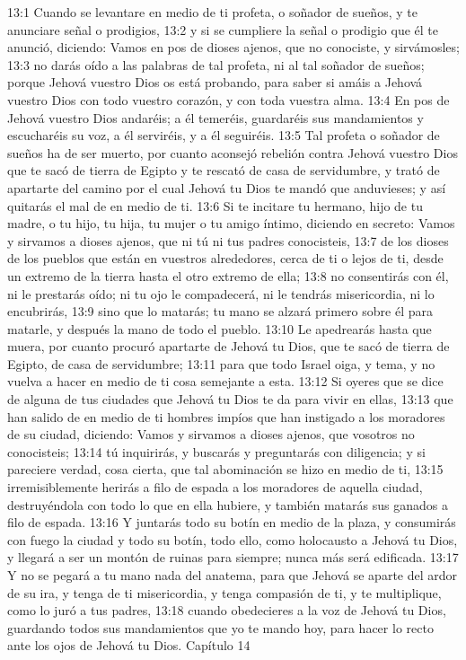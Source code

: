 13:1 Cuando se levantare en medio de ti profeta, o soñador de sueños, y te anunciare señal o prodigios,  
13:2 y si se cumpliere la señal o prodigio que él te anunció, diciendo: Vamos en pos de dioses ajenos, que no conociste, y sirvámosles;  
13:3 no darás oído a las palabras de tal profeta, ni al tal soñador de sueños; porque Jehová vuestro Dios os está probando, para saber si amáis a Jehová vuestro Dios con todo vuestro corazón, y con toda vuestra alma.  
13:4 En pos de Jehová vuestro Dios andaréis; a él temeréis, guardaréis sus mandamientos y escucharéis su voz, a él serviréis, y a él seguiréis.  
13:5 Tal profeta o soñador de sueños ha de ser muerto, por cuanto aconsejó rebelión contra Jehová vuestro Dios que te sacó de tierra de Egipto y te rescató de casa de servidumbre, y trató de apartarte del camino por el cual Jehová tu Dios te mandó que anduvieses; y así quitarás el mal de en medio de ti.  
13:6 Si te incitare tu hermano, hijo de tu madre, o tu hijo, tu hija, tu mujer o tu amigo íntimo, diciendo en secreto: Vamos y sirvamos a dioses ajenos, que ni tú ni tus padres conocisteis,  
13:7 de los dioses de los pueblos que están en vuestros alrededores, cerca de ti o lejos de ti, desde un extremo de la tierra hasta el otro extremo de ella;  
13:8 no consentirás con él, ni le prestarás oído; ni tu ojo le compadecerá, ni le tendrás misericordia, ni lo encubrirás,  
13:9 sino que lo matarás; tu mano se alzará primero sobre él para matarle, y después la mano de todo el pueblo.  
13:10 Le apedrearás hasta que muera, por cuanto procuró apartarte de Jehová tu Dios, que te sacó de tierra de Egipto, de casa de servidumbre;  
13:11 para que todo Israel oiga, y tema, y no vuelva a hacer en medio de ti cosa semejante a esta.  
13:12 Si oyeres que se dice de alguna de tus ciudades que Jehová tu Dios te da para vivir en ellas,  
13:13 que han salido de en medio de ti hombres impíos que han instigado a los moradores de su ciudad, diciendo: Vamos y sirvamos a dioses ajenos, que vosotros no conocisteis;  
13:14 tú inquirirás, y buscarás y preguntarás con diligencia; y si pareciere verdad, cosa cierta, que tal abominación se hizo en medio de ti,  
13:15 irremisiblemente herirás a filo de espada a los moradores de aquella ciudad, destruyéndola con todo lo que en ella hubiere, y también matarás sus ganados a filo de espada.  
13:16 Y juntarás todo su botín en medio de la plaza, y consumirás con fuego la ciudad y todo su botín, todo ello, como holocausto a Jehová tu Dios, y llegará a ser un montón de ruinas para siempre; nunca más será edificada.  
13:17 Y no se pegará a tu mano nada del anatema, para que Jehová se aparte del ardor de su ira, y tenga de ti misericordia, y tenga compasión de ti, y te multiplique, como lo juró a tus padres,  
13:18 cuando obedecieres a la voz de Jehová tu Dios, guardando todos sus mandamientos que yo te mando hoy, para hacer lo recto ante los ojos de Jehová tu Dios.  
Capítulo 14 

